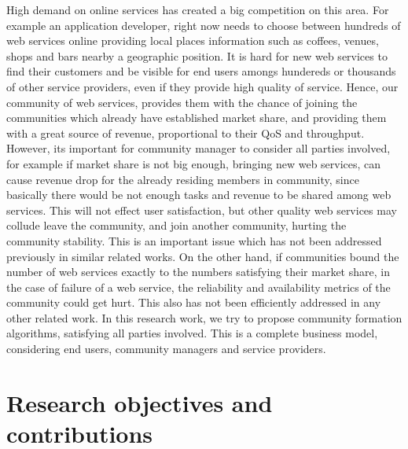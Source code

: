 High demand on online services has created a big competition on this area. For example an application developer, right now needs to choose between hundreds of web services online providing local places information such as coffees, venues, shops and bars nearby a geographic position. It is hard for new web services to find their customers and be visible for end users amongs hundereds or thousands of other service providers, even if they provide high quality of service. Hence, our community of web services, provides them with the chance of joining the communities which already have established market share, and providing them with a great source of revenue, proportional to their QoS and throughput. However, its important for community manager to consider all parties involved, for example if market share is not big enough, bringing
new web services, can cause revenue drop for the already residing members in community, since basically there would be not enough tasks and revenue to be shared among web services. This will not effect user satisfaction, but other quality web services may collude leave the community, and join another community, hurting the community stability. This is an important issue which has not been addressed previously in similar related works. On the other hand, if communities bound the number of web services exactly to the numbers satisfying their market share, in the case of failure of a web service, the reliability and availability metrics of the community could get hurt. This also has not been efficiently addressed in any other related work. In this research work, we try to propose community formation algorithms, satisfying all parties involved. This is a complete business model, considering end users, community managers and service providers.


\section{Research objectives and contributions}\label{sec:contribution}

